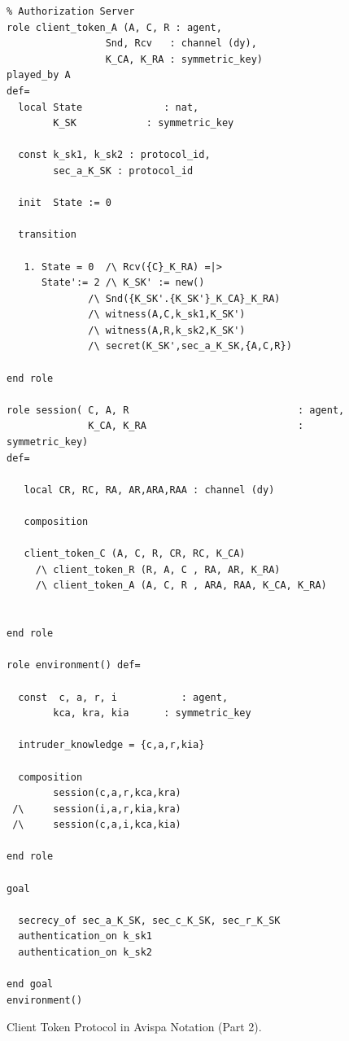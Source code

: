 \documentclass[peerreview, a4paper, 7pt]{IEEEtran}
\begin{document}
\begin{figure}[!htbp]
\begin{lstlisting}
% Authorization Server
role client_token_A (A, C, R : agent,
                 Snd, Rcv   : channel (dy),
                 K_CA, K_RA : symmetric_key)
played_by A
def=
  local State              : nat,
        K_SK            : symmetric_key

  const k_sk1, k_sk2 : protocol_id,
        sec_a_K_SK : protocol_id

  init  State := 0

  transition

   1. State = 0  /\ Rcv({C}_K_RA) =|> 
      State':= 2 /\ K_SK' := new()
              /\ Snd({K_SK'.{K_SK'}_K_CA}_K_RA) 
              /\ witness(A,C,k_sk1,K_SK')
              /\ witness(A,R,k_sk2,K_SK')
              /\ secret(K_SK',sec_a_K_SK,{A,C,R})
			  	  
end role

role session( C, A, R                             : agent,
              K_CA, K_RA                          : symmetric_key)
def=

   local CR, RC, RA, AR,ARA,RAA : channel (dy)

   composition

   client_token_C (A, C, R, CR, RC, K_CA) 
     /\ client_token_R (R, A, C , RA, AR, K_RA)
	 /\ client_token_A (A, C, R , ARA, RAA, K_CA, K_RA)


end role

role environment() def=

  const  c, a, r, i           : agent,
        kca, kra, kia      : symmetric_key

  intruder_knowledge = {c,a,r,kia}

  composition
        session(c,a,r,kca,kra)
 /\     session(i,a,r,kia,kra)
 /\     session(c,a,i,kca,kia)

end role

goal

  secrecy_of sec_a_K_SK, sec_c_K_SK, sec_r_K_SK
  authentication_on k_sk1 
  authentication_on k_sk2 

end goal
environment()
\end{lstlisting}
\caption{Client Token Protocol in Avispa Notation (Part 2).}
\label{avispa-code-figure2}
\end{figure}
\end{document}
